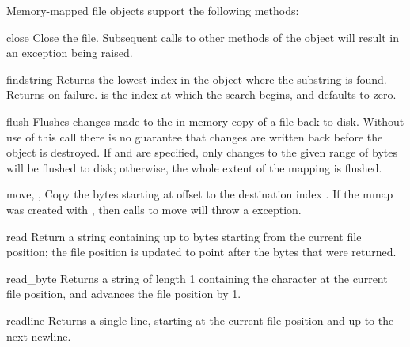 Memory-mapped file objects support the following methods:


\begin{methoddesc}[mmap]{close}{}
  Close the file.  Subsequent calls to other methods of the object
  will result in an exception being raised.
\end{methoddesc}

\begin{methoddesc}[mmap]{find}{string}
  Returns the lowest index in the object where the substring
   is found.  Returns  on failure.  
  is the index at which the search begins, and defaults to zero.
\end{methoddesc}

\begin{methoddesc}[mmap]{flush}{}
  Flushes changes made to the in-memory copy of a file back to disk.
  Without use of this call there is no guarantee that changes are
  written back before the object is destroyed.  If  and
   are specified, only changes to the given range of bytes
  will be flushed to disk; otherwise, the whole extent of the mapping
  is flushed.
\end{methoddesc}

\begin{methoddesc}[mmap]{move}{, , }
  Copy the  bytes starting at offset  to the
  destination index .  If the mmap was created with
  , then calls to move will throw a
   exception.
\end{methoddesc}

\begin{methoddesc}[mmap]{read}{}
  Return a string containing up to  bytes starting from the
  current file position; the file position is updated to point after the
  bytes that were returned.
\end{methoddesc}

\begin{methoddesc}[mmap]{read_byte}{}
  Returns a string of length 1 containing the character at the current
  file position, and advances the file position by 1.
\end{methoddesc}

\begin{methoddesc}[mmap]{readline}{}
  Returns a single line, starting at the current file position and up to
  the next newline.
\end{methoddesc}

